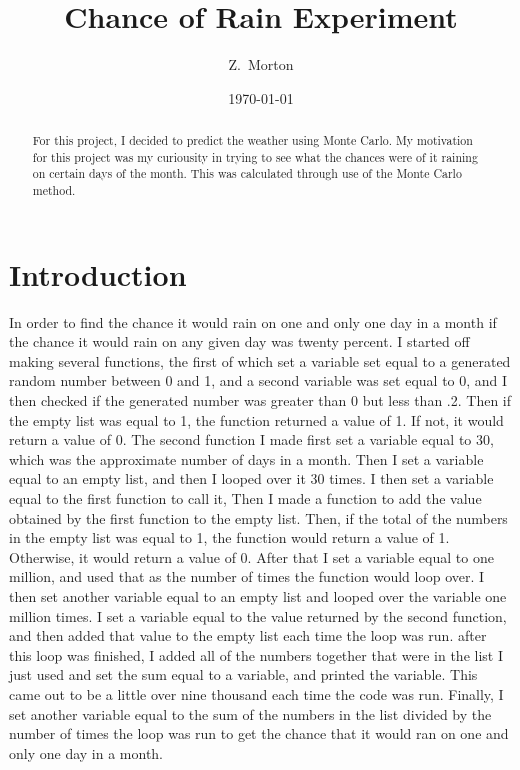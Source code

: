 \documentclass[twocolumn]{revtex4}
\begin{document}
\title{
Chance of Rain Experiment
}

\author{Z.~Morton}

\date{\today}

\begin{abstract}
	For this project, I decided to predict the weather using Monte Carlo. My motivation for this project was my curiousity in trying to see what the chances were of it raining on certain days of the month. This was calculated through use of the Monte Carlo method.
\end{abstract}
\maketitle

\section{Introduction}
	In order to find the chance it would rain on one and only one day in a month if the chance it would rain on any given day was twenty percent. I started off making several functions, the first of which set a variable set equal to a generated random number between 0 and 1, and a second variable was set equal to 0, and I then checked if the generated number was greater than 0 but less than .2. Then if the empty list was equal to 1, the function returned a value of 1. If not, it would return a value of 0. 
The second function I made first set a variable equal to 30, which was the approximate number of days in a month. Then I set a variable equal to an empty list, and then I looped over it 30 times. I then set a variable equal to the first function to call it, Then I made a function to add the value obtained by the first function to the empty list. Then, if the total of the numbers in the empty list was equal to 1, the function would return a value of 1. Otherwise, it would return a value of 0. 
 After that I set a variable equal to one million, and used that as the number of times the function would loop over. I then set another variable equal to an empty list and looped over the variable one million times. I set a variable equal to the value returned by the second function, and then added that value to the empty list each time the loop was run. after this loop was finished, I added all of the numbers together that were in the list I just used and set the sum equal to a variable, and printed the variable. This came out to be a little over nine thousand each time the code was run. Finally, I set another variable equal to the sum of the numbers in the list divided by the number of times the loop was run to get the chance that it would ran on one and only one day in a month.
\end{document}
